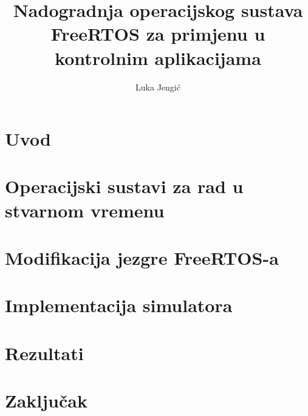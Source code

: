 \documentclass[times, utf8, zavrsni, numeric]{fer}
\begin{document}

\title{Nadogradnja operacijskog sustava FreeRTOS za primjenu u kontrolnim aplikacijama}

\author{Luka Jengić}

\maketitle


\renewcommand\contentsname{Sadržaj}
\tableofcontents

\chapter{Uvod} 


\chapter{Operacijski sustavi za rad u stvarnom vremenu}


\chapter{Modifikacija jezgre FreeRTOS-a}


\chapter{Implementacija simulatora}


\chapter{Rezultati}


\chapter{Zaključak}





\end{document}

